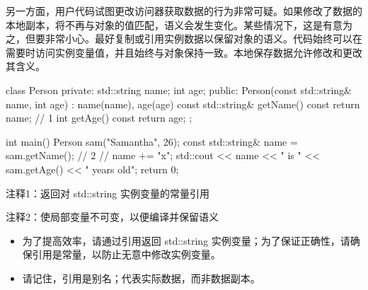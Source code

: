 另一方面，用户代码试图更改访问器获取数据的行为非常可疑。如果修改了数据的本地副本，将不再与对象的值匹配，语义会发生变化。某些情况下，这是有意为之，但要非常小心。最好复制或引用实例数据以保留对象的语义。代码始终可以在需要时访问实例变量值，并且始终与对象保持一致。本地保存数据允许修改和更改其含义。


\begin{cpp}
class Person {
private:
  std::string name;
  int age;
public:
  Person(const std::string& name, int age) : name(name), age(age) {}
  const std::string& getName() const { return name; } // 1
  int getAge() const { return age; }
};

int main() {
  Person sam("Samantha", 26);
  const std::string& name = sam.getName(); // 2
  // name += "x";
  std::cout << name << " is " << sam.getAge() << " years old\n";
  return 0;
}
\end{cpp}

{\footnotesize
注释1：返回对 std::string 实例变量的常量引用

注释2：使局部变量不可变，以便编译并保留语义
}


\begin{itemize}
\item
为了提高效率，请通过引用返回 std::string 实例变量；为了保证正确性，请确保引用是常量，以防止无意中修改实例变量。

\item
请记住，引用是别名；代表实际数据，而非数据副本。
\end{itemize}



















